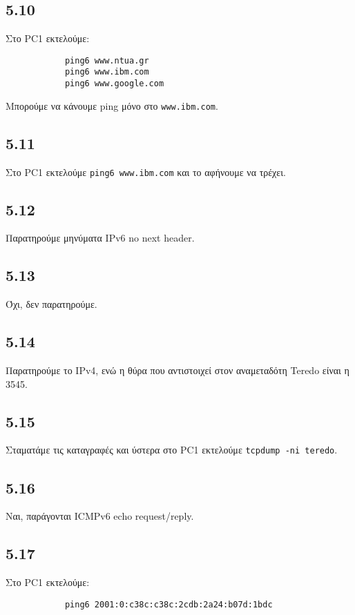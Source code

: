 \documentclass[a4paper, 12pt]{article}
\begin{document}
	\subsection*{5.10}
		Στο PC1 εκτελούμε:
		
		\begin{verbatim}
			ping6 www.ntua.gr
			ping6 www.ibm.com
			ping6 www.google.com
		\end{verbatim}
		
		Μπορούμε να κάνουμε ping μόνο στο \verb|www.ibm.com|.

	\subsection*{5.11}
		Στο PC1 εκτελούμε \verb|ping6 www.ibm.com| και το αφήνουμε να τρέχει.

	\subsection*{5.12}
		Παρατηρούμε μηνύματα IPv6 no next header.

	\subsection*{5.13}
		Όχι, δεν παρατηρούμε.

	\subsection*{5.14}
		Παρατηρούμε το IPv4, ενώ η θύρα που αντιστοιχεί στον αναμεταδότη Teredo είναι η 3545.

	\subsection*{5.15}
		Σταματάμε τις καταγραφές και ύστερα στο PC1 εκτελούμε \verb|tcpdump -ni teredo|.

	\subsection*{5.16}
		Ναι, παράγονται ICMPv6 echo request/reply.

	\subsection*{5.17}
		Στο PC1 εκτελούμε:
		 
		\begin{verbatim}
			ping6 2001:0:c38c:c38c:2cdb:2a24:b07d:1bdc
		\end{verbatim}
		
\end{document}
